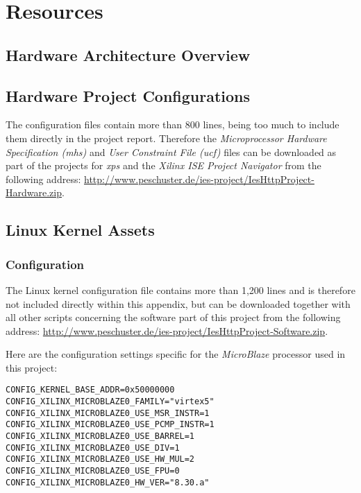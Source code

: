 \appendix 

\chapter{Resources}

\section{Hardware Architecture Overview}
\label{sec:hw_arch}

\begin{figure}[H]
\centering
\end{figure}


\section{Hardware Project Configurations}

The configuration files contain more than 800 lines, being too much to include them directly in the project report. Therefore the \textit{Microprocessor Hardware Specification (mhs)} and \textit{User Constraint File (ucf)} files can be downloaded as part of the projects for \textit{\gls{xps}} and the \textit{Xilinx ISE Project Navigator} from the following address: \url{http://www.peschuster.de/ies-project/IesHttpProject-Hardware.zip}.
\\

\section{Linux Kernel Assets}

\subsection{Configuration}

The Linux kernel configuration file contains more than 1,200 lines and is therefore not included directly within this appendix, but can be downloaded together with all other scripts concerning the software part of this project from the following address: \url{http://www.peschuster.de/ies-project/IesHttpProject-Software.zip}.

Here are the configuration settings specific for the \textit{MicroBlaze} processor used in this project:

\begin{verbatim}
CONFIG_KERNEL_BASE_ADDR=0x50000000
CONFIG_XILINX_MICROBLAZE0_FAMILY="virtex5"
CONFIG_XILINX_MICROBLAZE0_USE_MSR_INSTR=1
CONFIG_XILINX_MICROBLAZE0_USE_PCMP_INSTR=1
CONFIG_XILINX_MICROBLAZE0_USE_BARREL=1
CONFIG_XILINX_MICROBLAZE0_USE_DIV=1
CONFIG_XILINX_MICROBLAZE0_USE_HW_MUL=2
CONFIG_XILINX_MICROBLAZE0_USE_FPU=0
CONFIG_XILINX_MICROBLAZE0_HW_VER="8.30.a"
\end{verbatim}

